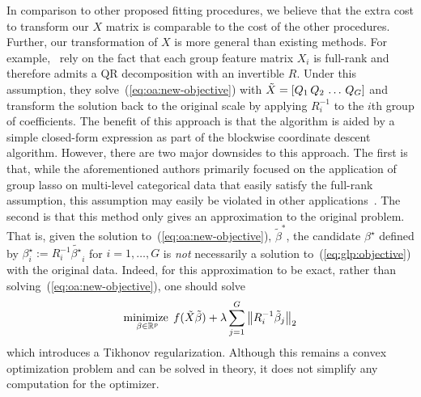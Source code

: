 In comparison to other proposed fitting procedures,
we believe that the extra cost to transform our $X$ matrix
is comparable to the cost of the other procedures.
Further, our transformation of $X$ is more general than existing methods.
For example,~\citet{yuan:2006,meier:2008} rely on the fact that
each group feature matrix $X_i$ is full-rank and therefore admits a QR decomposition with an invertible $R$.
Under this assumption, they solve~(\ref{eq:oa:new-objective}) with $\tilde{X} = \left[Q_1 \, Q_2 \, \ldots \, Q_G\right]$
and transform the solution back to the original scale by applying $R_i^{-1}$ to the $i$th group of coefficients.
The benefit of this approach is that the algorithm is aided by a simple closed-form expression
as part of the blockwise coordinate descent algorithm.
However, there are two major downsides to this approach.
The first is that, while the aforementioned authors primarily focused on the application of group lasso 
on multi-level categorical data that easily satisfy the full-rank assumption,
this assumption may easily be violated in other applications~\citep{simon:2012}.
The second is that this method only gives an approximation to the original problem.
That is, given the solution to~(\ref{eq:oa:new-objective}), $\tilde{\beta}^*$,
the candidate $\beta^\star$ defined by $\beta^\star_i := R_i^{-1} \tilde{\beta^\star}_i$ 
for $i=1,\ldots, G$ is \emph{not} necessarily a solution to~(\ref{eq:glp:objective})
with the original data.
Indeed, for this approximation to be exact, 
rather than solving~(\ref{eq:oa:new-objective}),
one should solve
\begin{align*}
    \operatorname*{minimize\;}_{\beta \in \mathbb{R}^p}
    f(\tilde{X} \tilde{\beta})
    + \lambda \sum\limits_{j=1}^G \left\|R_i^{-1} \tilde{\beta}_j\right\|_2
\end{align*}
which introduces a Tikhonov regularization.
Although this remains a convex optimization problem and can be solved in theory,
it does not simplify any computation for the optimizer.

